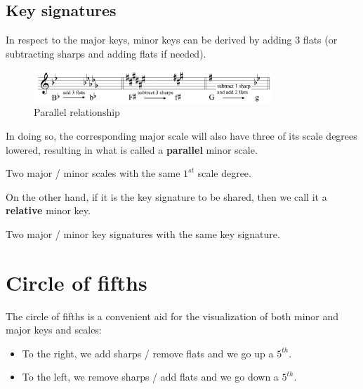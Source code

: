\subsection{Key signatures}
In respect to the major keys, minor keys can be derived by adding 3 flats (or subtracting sharps and adding flats if needed).

\begin{figure}
    \begin{center}
        \includegraphics[width=0.8\textwidth]{img/parallel}
        \caption{Parallel relationship}
    \end{center}
\end{figure}

In doing so, the corresponding major scale will also have three of its scale degrees lowered, resulting in what is called a \textbf{parallel} minor scale.

\begin{definition}
    Two major / minor scales with the same $1^{st}$ scale degree.
\end{definition}

On the other hand, if it is the key signature to be shared, then we call it a \textbf{relative} minor key.

\begin{definition}
    Two major / minor key signatures with the same key signature.
\end{definition}

\section{Circle of fifths}
The circle of fifths is a convenient aid for the visualization of both minor and major keys and scales:
\begin{itemize}
    \item To the right, we add sharps / remove flats and we go up a $5^{th}$.
    \item To the left, we remove sharps / add flats and we go down a $5^{th}$.
\end{itemize}

